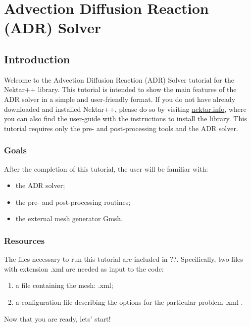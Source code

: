 \chapter{Advection Diffusion Reaction (ADR) Solver}
\label{ADR}

\section*{Introduction}
Welcome to the Advection Diffusion Reaction (ADR) Solver tutorial for the Nektar++ library.
This tutorial is intended to show the main features of the ADR solver in a simple and user-friendly 
format. If you do not have already downloaded and installed Nektar++, please do so by visiting 
\href{http://www.nektar.info}{nektar.info}, where you can also find the user-guide with the instructions 
to install the library. This tutorial requires only the pre- and post-processing tools and the ADR 
solver.



\subsection*{Goals}
After the completion of this tutorial, the user will be familiar with:
\vspace{-0.5cm}
\begin{itemize}
\item the ADR solver;
\item the pre- and post-processing routines;
\item the external mesh generator Gmsh.
\end{itemize}

\subsection*{Resources}
The files necessary to run this tutorial are included in ??.  
Specifically, two files with extension \textsf{.xml} are needed as input to the code: 
\vspace{-0.5cm}
\begin{enumerate}
\item a file containing the mesh: \textsf{.xml};
\item a configuration file describing the options for the particular problem \textsf{.xml} .
\end{enumerate}

\begin{center}
Now that you are ready, lets' start!
\end{center}

